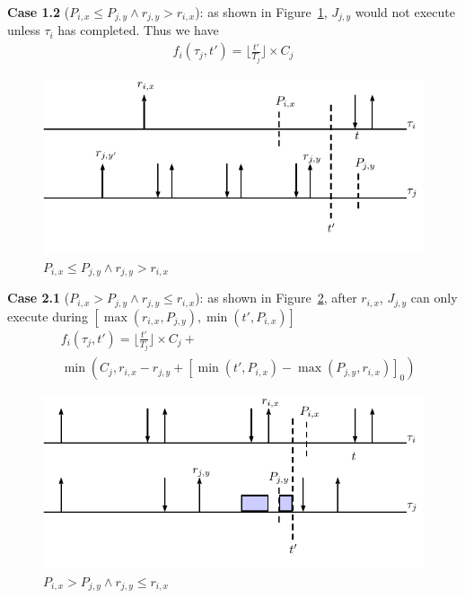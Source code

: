 \textbf{Case 1.2} ($P_{i,x}\leq P_{j,y}\wedge r_{j,y}> r_{i,x}$): as shown in  Figure~\ref{fig:case4},  $J_{j,y}$ would not execute unless $\tau_i$ has completed. Thus we have
\begin{align*}
		f_i(\tau_j,t')=\lfloor \frac{t'}{T_j}\rfloor\times C_j
\end{align*}

\begin{figure}[h!]
 \centering
\includegraphics[scale=0.7]{Figure/C31}  
\caption{$P_{i,x}\leq P_{j,y}\wedge r_{j,y}> r_{i,x}$}
  \label{fig:case4}
\end{figure}



\textbf{Case 2.1} ($P_{i,x}>P_{j,y}\wedge r_{j,y}\leq r_{i,x}$): as shown in  Figure~\ref{fig:case5}, after $r_{i,x}$,  $J_{j,y}$ can only execute during $[\max(r_{i,x},P_{j,y}),	\min(t',P_{i,x})]$
	\begin{align*}
		&f_i(\tau_j,t')=\lfloor \frac{t'}{T_j}\rfloor\times C_j+\\
		&\min\left(C_j,r_{i,x}-r_{j,y}+[\min(t',P_{i,x})-\max(P_{j,y},r_{i,x})]_0\right)
	\end{align*}


\begin{figure}[h!]
 \centering
\includegraphics[scale=0.7]{Figure/C4}  
\caption{$P_{i,x}>P_{j,y}\wedge r_{j,y}\leq r_{i,x}$}
  \label{fig:case5}
\end{figure}

